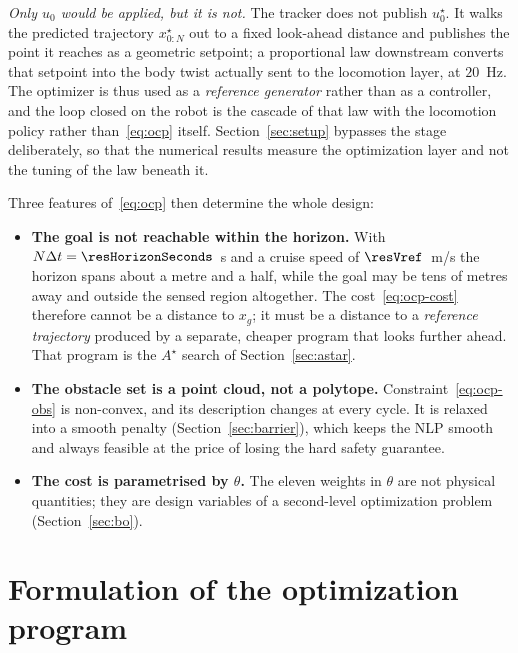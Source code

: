 \documentclass[11pt,a4paper]{article}
\newcommand{\astar}{$A^\star$}
\begin{document}
\emph{Only $u_0$ would be applied, but it is not.} The tracker does not publish $u^\star_0$. It walks the
predicted trajectory $x^\star_{0:N}$ out to a fixed look-ahead distance and publishes the point it reaches as
a geometric setpoint; a proportional law downstream converts that setpoint into the body twist actually sent
to the locomotion layer, at $20$~Hz. The optimizer is thus used as a \emph{reference generator} rather than
as a controller, and the loop closed on the robot is the cascade of that law with the locomotion policy
rather than~\eqref{eq:ocp} itself. Section~\ref{sec:setup} bypasses the stage deliberately, so that the
numerical results measure the optimization layer and not the tuning of the law beneath it.

Three features of~\eqref{eq:ocp} then determine the whole design:

\begin{itemize}
  \item \textbf{The goal is not reachable within the horizon.} With $N\Delta t=\resHorizonSeconds$~s and a
        cruise speed of $\resVref$~m/s the horizon spans about a metre and a half, while the goal may be tens of metres away
        and outside the sensed region altogether. The cost~\eqref{eq:ocp-cost} therefore cannot be a distance to $x_g$; it
        must be a distance to a \emph{reference trajectory} produced by a separate, cheaper program that
        looks further ahead. That program is the \astar{} search of Section~\ref{sec:astar}.
  \item \textbf{The obstacle set is a point cloud, not a polytope.} Constraint~\eqref{eq:ocp-obs} is
        non-convex, and its description changes at every cycle. It is relaxed into a smooth penalty
        (Section~\ref{sec:barrier}), which keeps the NLP smooth and always feasible at the price of losing
        the hard safety guarantee.
  \item \textbf{The cost is parametrised by $\theta$.} The eleven weights in $\theta$ are not physical
        quantities; they are design variables of a second-level optimization problem
        (Section~\ref{sec:bo}).
\end{itemize}

\section{Formulation of the optimization program}
\label{sec:formulation}
\end{document}

